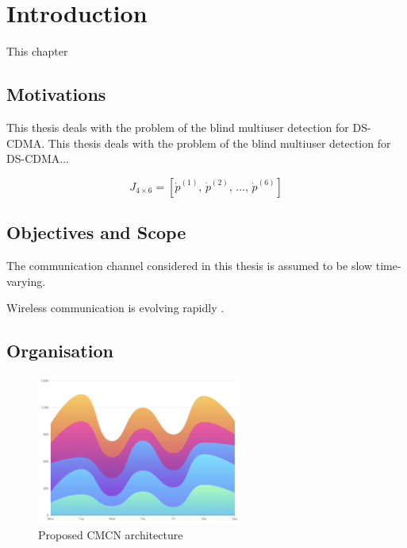 \chapter{Introduction}
\begingroup
\raggedright
{}
\setlength{\parskip}{0.5\baselineskip}
\titlespacing{\chapter}{0pt}{0pt}{0pt}
\titlespacing{\section}{0pt}{0pt}{0pt}

This chapter \lipsum[1]

\section{Motivations}

This thesis deals with the problem of the blind multiuser detection for DS-CDMA. This thesis deals with the problem of the blind multiuser detection for DS-CDMA...

\begin{equation}
J_{4\times 6} = \left[\dot{p}^{(1)},\, \dot{p}^{(2)},\, \dots,\, \dot{p}^{(6)}\right]
\end{equation}

\lipsum[1-2]

\section{Objectives and Scope}

The communication channel considered in this thesis is assumed to be slow time-varying. \lipsum[1]

Wireless communication is evolving rapidly \cite{jordan2002,padgett1995}.

\section{Organisation}

\lipsum[1-2]

\begin{figure}[h]
    \centering
    \includegraphics[width=0.6\textwidth]{assets/figures/demo.png}
    \caption{Proposed CMCN architecture}
    \label{fig:cmcn}
\end{figure}

\endgroup